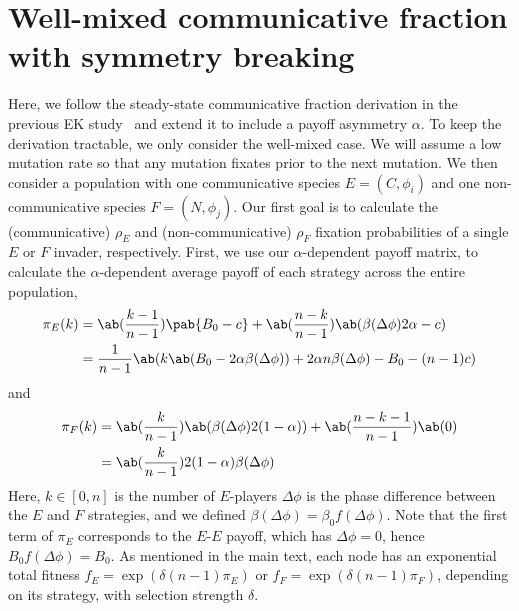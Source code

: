 \documentclass[10pt,letterpaper]{article}
\begin{document}
\section{Well-mixed communicative fraction with symmetry breaking}\label{sec:analytic_comm_frac}
Here, we follow the steady-state communicative fraction derivation
in the previous EK study~\cite{tripp2022evolutionary}
and extend it to include a payoff asymmetry $\alpha$.
To keep the derivation tractable,
we only consider the well-mixed case.
We will assume a low mutation rate
so that any mutation fixates prior to the next mutation.
We then consider a population with one communicative species $E = (C, \phi_i)$
and one non-communicative species $F = (N, \phi_j)$.
Our first goal is to calculate
the (communicative) $\rho_E$ and (non-communicative) $\rho_F$
fixation probabilities of a single $E$ or $F$ invader, respectively.
First, we use our $\alpha$-dependent payoff matrix,
to calculate the $\alpha$-dependent average payoff
of each strategy across the entire population,
\begin{align}
  \pi_E(k) &= \ab(\frac{k-1}{n-1}) \pab{B_0 - c}
                + \ab(\frac{n-k}{n-1}) \ab(\beta(\Delta\phi) 2\alpha - c) \\
           &= \frac{1}{n-1}
               \ab(k \ab(B_0 - 2 \alpha \beta(\Delta\phi))
                 + 2 \alpha n \beta(\Delta\phi) - B_0 - (n-1) c)
\end{align}
and
\begin{align}
  \pi_F(k) &= \ab(\frac{k}{n-1}) \ab(\beta(\Delta\phi) 2 (1-\alpha))
                + \ab(\frac{n-k-1}{n-1}) \ab(0) \\
           &= \ab(\frac{k}{n-1}) 2 (1-\alpha) \beta(\Delta\phi)
\end{align}
Here, $k \in [0,n]$ is the number of $E$-players
$\Delta \phi$ is the phase difference between the $E$ and $F$
strategies,
and we defined $\beta(\Delta \phi) = \beta_0 f(\Delta \phi)$.
Note that the first term of $\pi_E$ corresponds
to the $E$-$E$ payoff, which has $\Delta \phi = 0$,
hence $B_0 f(\Delta \phi) = B_0$.
As mentioned in the main text,
each node has an exponential total fitness
$f_E = \exp(\delta (n-1) \pi_E)$
or
$f_F = \exp(\delta (n-1) \pi_F)$,
depending on its strategy,
with selection strength $\delta$.
\end{document}

